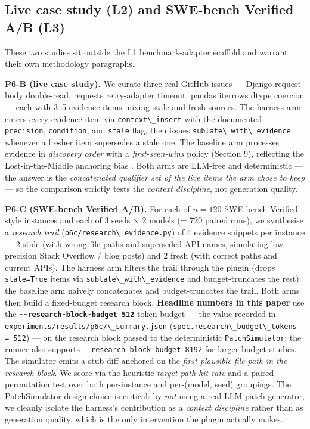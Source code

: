 \subsection{Live case study (L2) and SWE-bench Verified A/B (L3)}\label{live-case-study-l2-and-swe-bench-verified-ab-l3}

These two studies sit outside the L1 benchmark-adapter scaffold and warrant their own methodology paragraphs.

\textbf{P6-B (live case study).} We curate three real GitHub issues --- Django request-body double-read, requests retry-adapter timeout, pandas iterrows dtype coercion --- each with 3--5 evidence items mixing stale and fresh sources. The harness arm enters every evidence item via \passthrough{\lstinline!context\_insert!} with the documented \passthrough{\lstinline!precision!}, \passthrough{\lstinline!condition!}, and \passthrough{\lstinline!stale!} flag, then issues \passthrough{\lstinline!sublate\_with\_evidence!} whenever a fresher item supersedes a stale one. The baseline arm processes evidence in \emph{discovery order} with a \emph{first-seen-wins} policy (Section 9), reflecting the Lost-in-the-Middle anchoring bias \citep{liu2023lostmiddle}. Both arms are LLM-free and deterministic --- the answer is the \emph{concatenated qualifier set of the live items the arm chose to keep} --- so the comparison strictly tests the \emph{context discipline}, not generation quality.

\textbf{P6-C (SWE-bench Verified A/B).} For each of \(n=120\) SWE-bench Verified-style instances and each of 3 seeds × 2 models (= 720 paired runs), we synthesise a \emph{research trail} (\passthrough{\lstinline!p6c/research\_evidence.py!}) of 4 evidence snippets per instance --- 2 stale (with wrong file paths and superseded API names, simulating low-precision Stack Overflow / blog posts) and 2 fresh (with correct paths and current APIs). The harness arm filters the trail through the plugin (drops \passthrough{\lstinline!stale=True!} items via \passthrough{\lstinline!sublate\_with\_evidence!} and budget-truncates the rest); the baseline arm naively concatenates and budget-truncates the trail. Both arms then build a fixed-budget research block. \textbf{Headline numbers in this paper} use the \textbf{\passthrough{\lstinline!--research-block-budget 512!}} token budget --- the value recorded in \passthrough{\lstinline!experiments/results/p6c/\_summary.json!} (\passthrough{\lstinline!spec.research\_budget\_tokens = 512!}) --- on the research block passed to the deterministic \passthrough{\lstinline!PatchSimulator!}; the runner also supports \passthrough{\lstinline!--research-block-budget 8192!} for larger-budget studies. The simulator emits a stub diff anchored on the \emph{first plausible file path in the research block}. We score via the heuristic \emph{target-path-hit-rate} and a paired permutation test over both per-instance and per-(model, seed) groupings. The PatchSimulator design choice is critical: by \emph{not} using a real LLM patch generator, we cleanly isolate the harness's contribution as a \emph{context discipline} rather than as generation quality, which is the only intervention the plugin actually makes.

